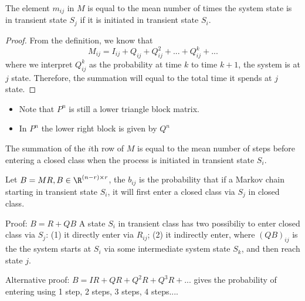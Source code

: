 \begin{refsection}
\begin{theorem}\cite[240]{luenberger1979introduction}\label{ch:markov-chains:th:generalabsorptionmeantime}
	The element $m_{ij}$ in $M$ is equal to the mean number of times the system state is in transient state $S_j$ if it is initiated in transient state $S_i$.
\end{theorem}
\begin{proof}
	From the definition, we know that $$M_{ij} = I_{ij}+Q_{ij} + Q_{ij}^2 + ... + Q_{ij}^k + ...$$
	where we interpret $Q_{ij}^k$ as the probability at time $k$ to time $k+1$, the system is at $j$ state. Therefore, the summation will equal to the total time it spends at $j$ state.
\end{proof}

\begin{remark}
	\begin{itemize}
		\item Note that $P^n$ is still a lower triangle block matrix.
		\item In $P^n$ the lower right block is given by $Q^n$
	\end{itemize}
\end{remark}

\begin{corollary}\cite[240]{luenberger1979introduction}
	The summation of the $i$th row of $M$ is equal to the mean number of steps before entering a closed class when the process is initiated in transient state $S_i$.
\end{corollary}




\begin{theorem}\label{ch:markov-chains:th:generalabsorptionprobability}\cite[241]{luenberger1979introduction}
	Let $B=MR,B\in \R^{(n-r)\times r}$, the $b_{ij}$ is the probability that if a Markov chain starting in transient state $S_i$, it will first enter a closed class via $S_j$ in closed class.
\end{theorem}
Proof: $B = R + QB$
A state $S_i$ in transient class has two possibiliy to enter closed class via $S_j$: (1) it directly enter via $R_{ij}$; (2) it indirectly enter, where $(QB)_{ij}$ is the the system starts at $S_i$ via some intermediate system state $S_k$, and then reach state $j$.

Alternative proof: $B = IR + QR + Q^2R + Q^3R + ...$ gives the probability of entering using 1 step, 2 steps, 3 steps, 4 steps....


\end{refsection}
